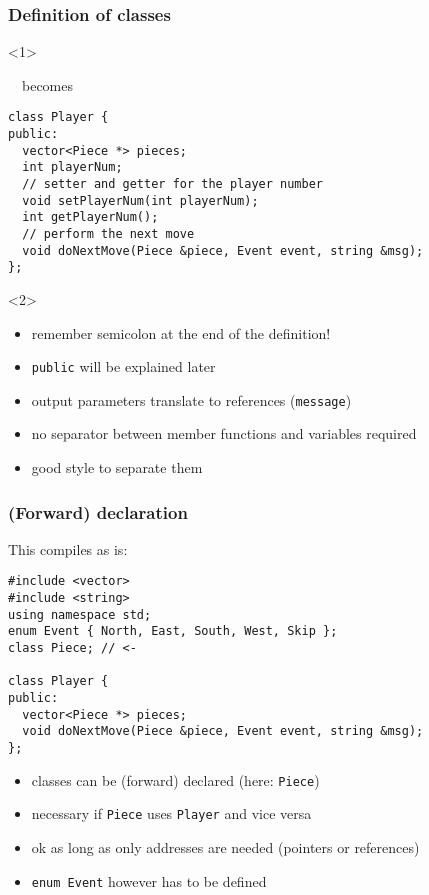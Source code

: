 \documentclass{slides}
\begin{document}
\begin{frame}[fragile]
  \frametitle{Definition of classes}

  \begin{onlyenv}<1> 
    ~~becomes
    \medskip
\end{onlyenv}

\begin{lstlisting}[emph={class,public}]
class Player {
public:
  vector<Piece *> pieces;
  int playerNum;
  // setter and getter for the player number
  void setPlayerNum(int playerNum);
  int getPlayerNum();
  // perform the next move
  void doNextMove(Piece &piece, Event event, string &msg);
};
\end{lstlisting}

\begin{onlyenv}<2>
  \begin{itemize}
  \item \alert{remember semicolon at the end of the definition!}
  \item \lstinline!public! will be explained later
  \item output parameters translate to references (\lstinline!message!)
  \item no separator between member functions and variables required
  \item good style to separate them
  \end{itemize}
\end{onlyenv}
\end{frame}

\begin{frame}[fragile]
  \frametitle{(Forward) declaration}

This compiles as is:
\begin{lstlisting}
#include <vector>
#include <string>
using namespace std;
enum Event { North, East, South, West, Skip };
class Piece; // <-

class Player {
public:
  vector<Piece *> pieces;
  void doNextMove(Piece &piece, Event event, string &msg);
};
\end{lstlisting}

  \begin{itemize}
  \item classes can be (forward) \alert{declared} (here: \lstinline!Piece!)
  \item necessary if \lstinline!Piece! uses \lstinline!Player!
    and vice versa
  \item ok as long as only addresses are needed (pointers or references)
  \item \lstinline!enum Event! however has to be defined
  \end{itemize}
  
\end{frame}
\end{document}
